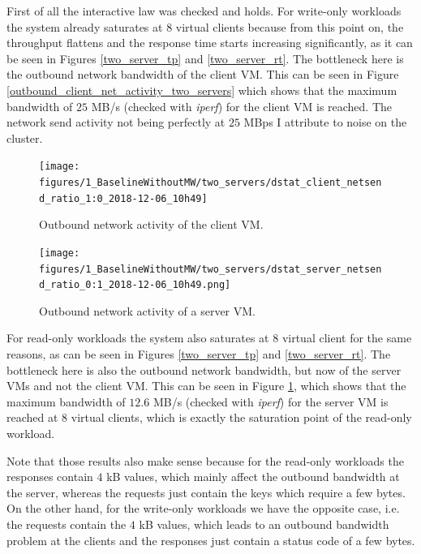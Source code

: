First of all the interactive law was checked and holds. 
For write-only workloads the system  already saturates at $8$ virtual clients because from this point on, the throughput flattens and the response time starts increasing significantly, as it can be seen in Figures \ref{two_server_tp} and \ref{two_server_rt}. The bottleneck here is the outbound network bandwidth of the client VM. This can be seen in Figure \ref{outbound_client_net_activity_two_servers} which shows that the maximum bandwidth of $25$ MB/s (checked with \textit{iperf}) for the client VM is reached. The network send activity not being perfectly at $25$ MBps I attribute to noise on the cluster.

\begin{figure}[H]
	\begin{minipage}{0.48\textwidth}
	    \centering
	    \texttt{[image: figures/1\_BaselineWithoutMW/two\_servers/dstat\_client\_netsend\_ratio\_1:0\_2018-12-06\_10h49]}
	    \caption{Outbound network activity of the client VM.}
	    \label{outbound_client_net_activity_two_servers}
   \end{minipage}\hfill
   \begin{minipage}{0.48\textwidth}
        \centering
	    \texttt{[image: figures/1\_BaselineWithoutMW/two\_servers/dstat\_server\_netsend\_ratio\_0:1\_2018-12-06\_10h49.png]}
	    \caption{Outbound network activity of a server VM.}
	    \label{outbound_server_net_activity_two_servers}
   \end{minipage}
\end{figure}

For read-only workloads the system also saturates at $8$ virtual client for the same reasons, as can be seen in Figures \ref{two_server_tp} and \ref{two_server_rt}. The bottleneck here is also the outbound network bandwidth, but now of the server VMs and not the client VM. This can be seen in Figure \ref{outbound_server_net_activity_two_servers}, which shows that the maximum bandwidth of $12.6$ MB/s (checked with \textit{iperf}) for the server VM is reached at $8$ virtual clients, which is exactly the saturation point of the read-only workload. 

Note that those results also make sense because for the read-only workloads the responses contain $4$ kB values, which mainly affect the outbound bandwidth at the server, whereas the requests just contain the keys which require a few bytes. On the other hand, for the write-only workloads we have the opposite case, i.e. the requests contain the $4$ kB values, which leads to an outbound bandwidth problem at the clients and the responses just contain a status code of a few bytes. 

